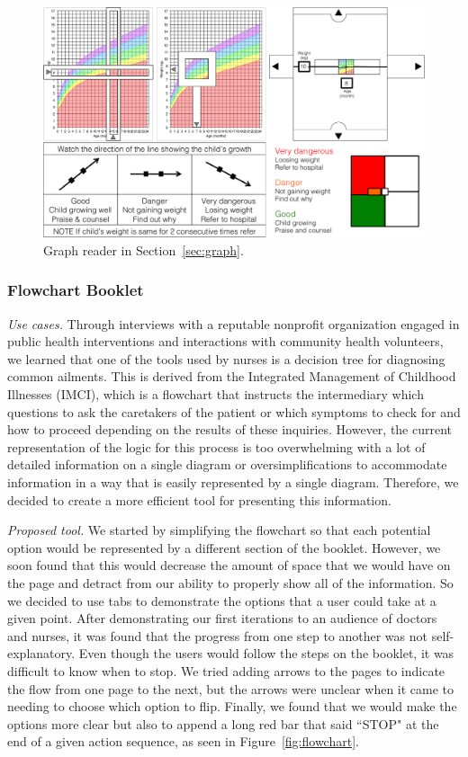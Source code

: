 \documentclass{sig-alternate}
\begin{document}
\begin{figure}
\centering
\includegraphics[width=\linewidth]{img/graph.png}
\caption{Graph reader in Section~\ref{sec:graph}.}
\label{fig:graph}
\end{figure}

\subsubsection{Flowchart Booklet}
\label{sec:flowchart}

\emph{Use cases.}
Through interviews with a reputable nonprofit organization engaged in public health interventions and interactions with community health volunteers, we learned that one of the tools used by nurses is a decision tree for diagnosing common ailments. This is derived from the Integrated Management of Childhood Illnesses (IMCI), which is a flowchart that instructs the intermediary which questions to ask the caretakers of the patient or which symptoms to check for and how to proceed depending on the results of these inquiries. However, the current representation of the logic for this process is too overwhelming with a lot of detailed information on a single diagram or oversimplifications to accommodate information in a way that is easily represented by a single diagram. Therefore, we decided to create a more efficient tool for presenting this information.

\emph{Proposed tool.}
We started by simplifying the flowchart so that each potential option would be represented by a different section of the booklet. However, we soon found that this would decrease the amount of space that we would have on the page and detract from our ability to properly show all of the information. So we decided to use tabs to demonstrate the options that a user could take at a given point. After demonstrating our first iterations to an audience of doctors and nurses, it was found that the progress from one step to another was not self-explanatory. Even though the users would follow the steps on the booklet, it was difficult to know when to stop. We tried adding arrows to the pages to indicate the flow from one page to the next, but the arrows were unclear when it came to needing to choose which option to flip. Finally, we found that we would make the options more clear but also to append a long red bar that said ``STOP" at the end of a given action sequence, as seen in Figure~\ref{fig:flowchart}.
\end{document}

